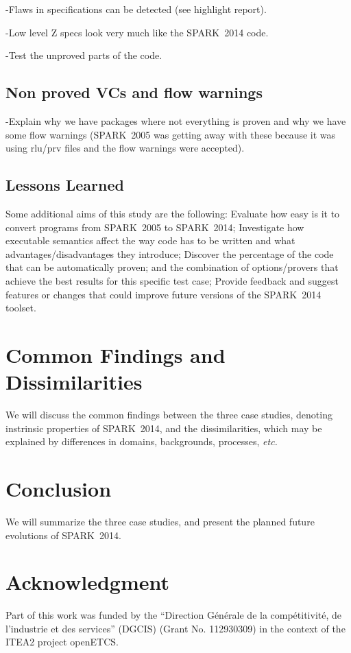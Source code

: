 \documentclass[10pt,a4paper,twocolumn]{article}
\newcommand{\oldspark}{SPARK~2005\xspace}
\newcommand{\newspark}{SPARK~2014\xspace}
\newcommand{\etc}{\textit{etc.}\xspace}
\begin{document}
-Flaws in specifications can be detected (see highlight report).

-Low level Z specs look very much like the \newspark code.

-Test the unproved parts of the code.

\subsection{Non proved VCs and flow warnings}

-Explain why we have packages where not everything is proven and why we
have some flow warnings (\oldspark was getting away with these because
it was using rlu/prv files and the flow warnings were accepted).

\subsection{Lessons Learned}

Some additional aims of this study are the following: Evaluate how
easy is it to convert programs from \oldspark to \newspark;
Investigate how executable semantics affect the way code has to be
written and what advantages/disadvantages they introduce; Discover the
percentage of the code that can be automatically proven; and the
combination of options/provers that achieve the best results for this
specific test case; Provide feedback and suggest features or changes
that could improve future versions of the \newspark toolset.

\section{Common Findings and Dissimilarities}

We will discuss the common findings between the three case studies,
denoting instrinsic properties of \newspark, and the dissimilarities,
which may be explained by differences in domains, backgrounds,
processes, \etc

\section{Conclusion}

We will summarize the three case studies, and present the planned future
evolutions of \newspark.

\section{Acknowledgment}

Part of this work was funded by the ``Direction Générale de la
compétitivité, de l'industrie et des services'' (DGCIS) (Grant
No. 112930309) in the context of the ITEA2 project openETCS.



\end{document}

